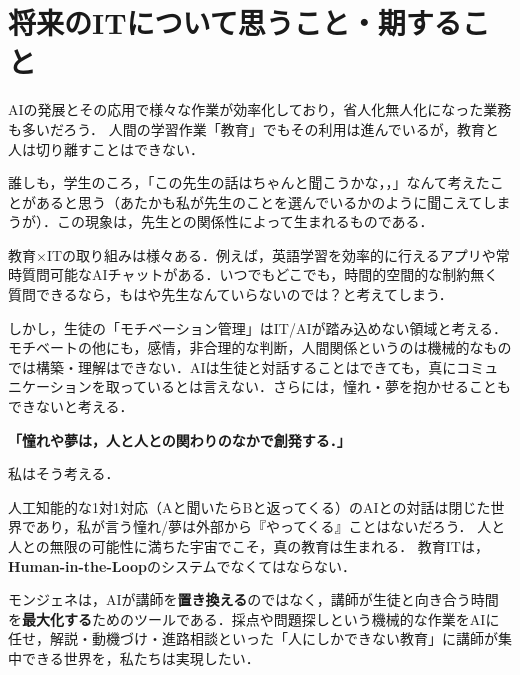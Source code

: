 \documentclass[paper=a4,fontsize=10.5bp,jafontsize=10.5bp,twocolumn]{jlreq}
\begin{document}
\section{将来のITについて思うこと・期すること}

AIの発展とその応用で様々な作業が効率化しており，省人化無人化になった業務も多いだろう．
人間の学習作業「教育」でもその利用は進んでいるが，教育と人は切り離すことはできない．

誰しも，学生のころ，「この先生の話はちゃんと聞こうかな，，」なんて考えたことがあると思う（あたかも私が先生のことを選んでいるかのように聞こえてしまうが）．この現象は，先生との関係性によって生まれるものである．

教育×ITの取り組みは様々ある．例えば，英語学習を効率的に行えるアプリや常時質問可能なAIチャットがある．いつでもどこでも，時間的空間的な制約無く質問できるなら，もはや先生なんていらないのでは？と考えてしまう．

しかし，生徒の「モチベーション管理」はIT/AIが踏み込めない領域と考える．モチベートの他にも，感情，非合理的な判断，人間関係というのは機械的なものでは構築・理解はできない．AIは生徒と対話することはできても，真にコミュニケーションを取っているとは言えない．さらには，憧れ・夢を抱かせることもできないと考える．

\begin{highlightbox}
\textbf{「憧れや夢は，人と人との関わりのなかで創発する．」}

私はそう考える．

人工知能的な1対1対応（Aと聞いたらBと返ってくる）のAIとの対話は閉じた世界であり，私が言う憧れ/夢は外部から『やってくる』ことはないだろう．
人と人との無限の可能性に満ちた宇宙でこそ，真の教育は生まれる．
教育ITは，\textbf{Human-in-the-Loop}のシステムでなくてはならない．
\end{highlightbox}

モンジェネは，AIが講師を\textbf{置き換える}のではなく，講師が生徒と向き合う時間を\textbf{最大化する}ためのツールである．採点や問題探しという機械的な作業をAIに任せ，解説・動機づけ・進路相談といった「人にしかできない教育」に講師が集中できる世界を，私たちは実現したい．
\end{document}
